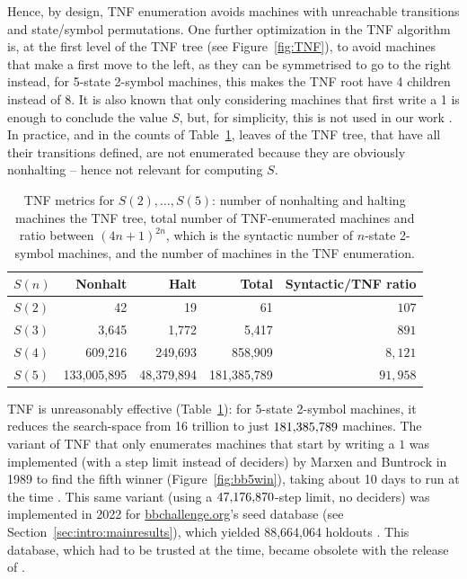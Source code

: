 Hence, by design, TNF enumeration avoids machines with unreachable transitions and state/symbol permutations. One further optimization in the TNF algorithm is,
at the first level of the TNF tree (see Figure~\ref{fig:TNF}), to avoid machines that make a first move to the left, as they can be symmetrised to go to the right instead, \eg for 5-state 2-symbol machines, this makes the TNF root have 4 children instead of 8. It is also known that only considering machines that first write a 1 is enough to conclude the value $S$, but, for simplicity, this is not used in our work \cite{Marxen_1990,busycoq}. In practice, and in the counts of Table~\ref{tab:TNF-numbers}, leaves of the TNF tree, that have all their transitions defined, are not enumerated because they are obviously nonhalting -- hence not relevant for computing $S$.

\begin{table}[h!]
    \centering
    \begin{tabular}{|l|r|r|r|r|}
        \hline
        $S(n)$ & Nonhalt     & Halt       & Total       & Syntactic/TNF ratio \\
        \hline
        $S(2)$ & 42          & 19         & 61          & $107$               \\
        $S(3)$ & 3,645       & 1,772      & 5,417       & $891$               \\
        $S(4)$ & 609,216     & 249,693    & 858,909     & $8,121$             \\
        $S(5)$ & 133,005,895 & 48,379,894 & 181,385,789 & $91{,}958$          \\
        \hline
    \end{tabular}

    \caption{TNF metrics for $S(2),\dots,S(5)$: number of nonhalting and halting machines the TNF tree, total number of TNF-enumerated machines and ratio between $(4n+1)^{2n}$, which is the syntactic number of $n$-state 2-symbol machines, and the number of machines in the TNF enumeration.}\label{tab:TNF-numbers}
\end{table}

TNF is unreasonably effective (Table~\ref{tab:TNF-numbers}): for 5-state 2-symbol machines, it reduces the search-space from 16 trillion to just $181{,}385{,}789$ machines. The variant of TNF that only enumerates machines that start by writing a $1$ was implemented (with a step limit instead of deciders) by Marxen and Buntrock in 1989 to find the fifth \BBfull winner (Figure~\ref{fig:bb5win}), taking about 10 days to run at the time \cite{Marxen_1990}. This same variant (using a $47{,}176{,}870$-step limit, no deciders) was implemented in 2022 for \url{bbchallenge.org}’s seed database (see Section~\ref{sec:intro:mainresults}), which yielded 88,664,064 holdouts  \cite{sterin_2022_14955828}. This database, which had to be trusted at the time, became obsolete with the release of \CoqBB. %

